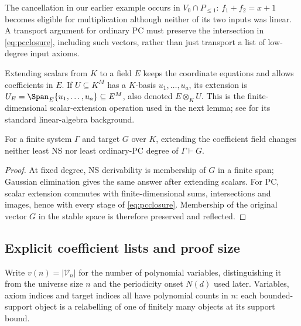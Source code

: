 The cancellation in our earlier example occurs in
$V_0\cap P_{\le1}$: $f_1+f_2=x+1$ becomes eligible for multiplication
although neither of its two inputs was linear. A transport argument
for ordinary PC must preserve the intersection in \eqref{eq:pcclosure},
including such vectors, rather than just transport a list of low-degree
input axioms.

Extending scalars from $K$ to a field $E$ keeps the coordinate equations
and allows coefficients in $E$. If $U\subseteq K^M$ has a $K$-basis
$u_1,\ldots,u_a$, its extension is
$U_E=\Span_E\{u_1,\ldots,u_a\}\subseteq E^M$, also denoted
$E\otimes_K U$. This is the finite-dimensional scalar-extension
operation used in the next lemma; see \cite{LangAlgebra} for its
standard linear-algebra background.

\begin{lemma}\label{lem:field}
For a finite system $\Gamma$ and target $G$ over $K$, extending the
coefficient field changes neither least NS nor least ordinary-PC
degree of $\Gamma\vdash G$.
\end{lemma}
\begin{proof}
At fixed degree, NS derivability is membership of $G$ in a finite span;
Gaussian elimination gives the same answer after extending scalars.
For PC, scalar extension commutes with finite-dimensional sums,
intersections and images, hence with every stage of
\eqref{eq:pcclosure}. Membership of the original vector $G$ in the
stable space is therefore preserved and reflected.
\end{proof}

\subsection{Explicit coefficient lists and proof size}\label{sec:dense-size}
Write $v(n)=|\mathcal V_n|$ for the number of polynomial variables,
distinguishing it from the universe size $n$ and the periodicity onset
$N(d)$ used later. Variables, axiom indices and target indices all have
polynomial counts in $n$: each bounded-support object is a relabelling
of one of finitely many objects at its support bound.


